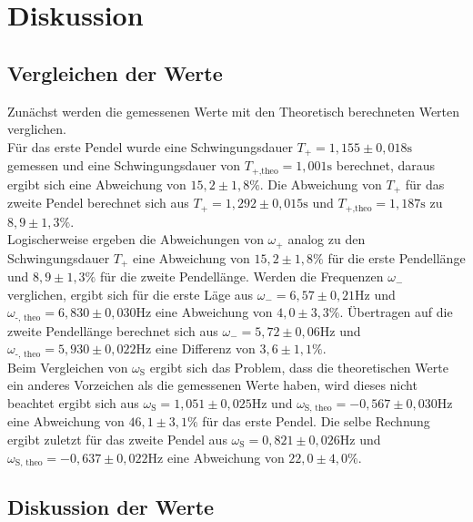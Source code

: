\section{Diskussion}

    \subsection{Vergleichen der Werte}
    
        \noindent Zunächst werden die gemessenen Werte mit den Theoretisch berechneten Werten verglichen. \\
        Für das erste Pendel wurde eine 
        Schwingungsdauer $T_+ = 1,155 \pm 0,018 \si{\s}$ gemessen und eine Schwingungsdauer von $T_{+\text{,theo}} = 1,001 \si{\s}$ berechnet,
        daraus ergibt sich eine Abweichung von $15,2 \pm 1,8 \%$.
        Die Abweichung von $T_+$ für das zweite Pendel berechnet sich aus $T_+ = 1,292 \pm 0,015 \si{\s}$ und 
        $T_{+\text{,theo}} = 1,187 \si{\s}$ zu $8,9 \pm 1,3 \%$.\\
        Logischerweise ergeben die Abweichungen von $\omega_+$ analog zu den Schwingungsdauer $T_+$ eine Abweichung von $15,2 \pm 1,8 \%$ 
        für die erste Pendellänge und $8,9 \pm 1,3 \%$ für die zweite Pendellänge.
        Werden die Frequenzen $\omega_-$ verglichen, ergibt sich für die erste Läge aus $\omega_{-} = 6,57 \pm 0,21 \si{\hertz}$ und
        $\omega_\text{-, theo} = 6,830 \pm 0,030 \si{\hertz}$ eine Abweichung von $ 4,0 \pm 3,3 \%$. 
        Übertragen auf die zweite Pendellänge berechnet sich aus  $\omega_{-} = 5,72 \pm 0,06 \si{\hertz}$ und 
        $\omega_\text{-, theo} = 5,930 \pm 0,022 \si{\hertz}$ eine Differenz von $ 3,6 \pm 1,1 \%$.\\
        Beim Vergleichen von $\omega_{\text{S}}$ ergibt sich das Problem, dass die theoretischen Werte ein anderes Vorzeichen als die gemessenen 
        Werte haben, wird dieses nicht beachtet ergibt sich aus $\omega_{\text{S}}= 1,051 \pm 0,025 \si{\hertz}$ und 
        $\omega_\text{S, theo} = -0,567 \pm 0,030 \si{\hertz}$ eine Abweichung von $46,1 \pm 3,1 \%$ für das erste Pendel.
        Die selbe Rechnung ergibt zuletzt für das zweite Pendel aus $ \omega_{\text{S}}= 0,821 \pm 0,026 \si{\hertz}$ und 
        $\omega_\text{S, theo} = -0,637 \pm 0,022 \si{\hertz}$ eine Abweichung von $ 22,0 \pm 4,0 \%$.
       
    \subsection{Diskussion der Werte}

